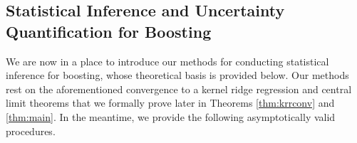 


\vspace{-1ex}
\subsection{Statistical Inference and Uncertainty Quantification for Boosting}
\label{sec:statistics}
\vspace{-1ex}

We are now in a place to introduce our methods for conducting statistical inference for boosting, whose theoretical basis is provided below. Our methods rest on the aforementioned convergence to a kernel ridge regression and central limit theorems that we formally prove later in Theorems \ref{thm:krrconv} and \ref{thm:main}. In the meantime, we provide the following asymptotically valid procedures.


\vspace{-1ex}
